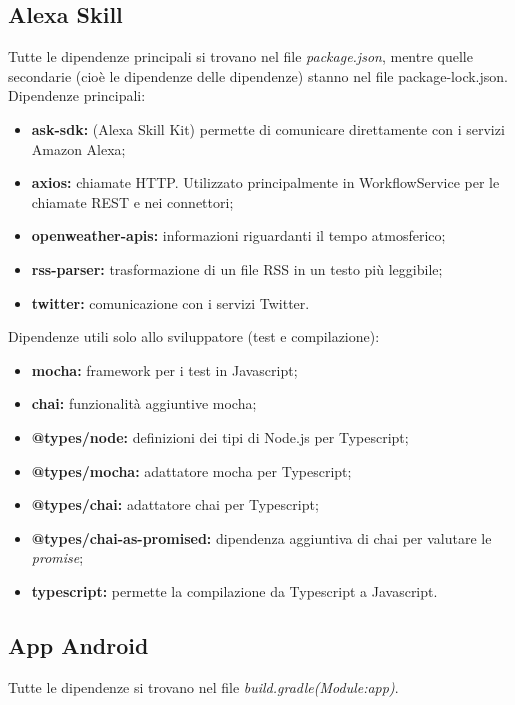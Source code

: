 \subsection{Alexa Skill}\label{ATecnologie}
Tutte le dipendenze principali si trovano nel file \textit{package.json}, mentre quelle secondarie (cioè le dipendenze delle dipendenze) stanno nel file package-lock.json.\\
Dipendenze principali:
\begin{itemize}
    \item \textbf{ask-sdk:} (Alexa Skill Kit) permette di comunicare direttamente con i servizi Amazon Alexa;
    \item \textbf{axios:} chiamate HTTP. Utilizzato principalmente in WorkflowService per le chiamate REST e nei connettori;
    \item \textbf{openweather-apis:} informazioni riguardanti il tempo atmosferico;
    \item \textbf{rss-parser:} trasformazione di un file RSS in un testo più leggibile;
    \item \textbf{twitter:} comunicazione con i servizi Twitter.
\end{itemize}
Dipendenze utili solo allo sviluppatore (test e compilazione):
\begin{itemize}
    \item \textbf{mocha:} framework per i test in Javascript;
    \item \textbf{chai:} funzionalità aggiuntive mocha;
    \item \textbf{@types/node:} definizioni dei tipi di Node.js per Typescript;
    \item \textbf{@types/mocha:} adattatore mocha per Typescript; 
    \item \textbf{@types/chai:} adattatore chai per Typescript;
    \item \textbf{@types/chai-as-promised:} dipendenza aggiuntiva di chai per valutare le \textit{promise};
    \item \textbf{typescript:} permette la compilazione da Typescript a Javascript.
\end{itemize}

\subsection{App Android}

Tutte le dipendenze si trovano nel file \textit{build.gradle(Module:app)}.\\

